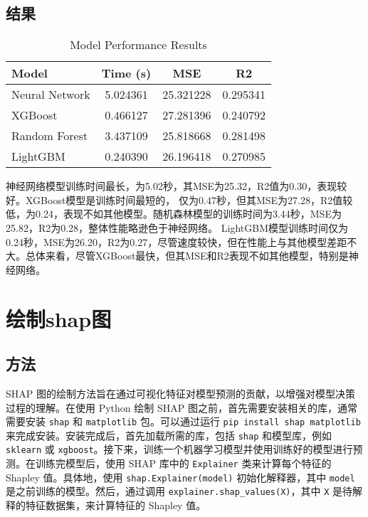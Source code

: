 \documentclass[AutoFakeBold]{LZUThesis-PgD&PhD}
\begin{document}
	\subsection{结果}
		\begin{table}[H]
			\centering
			\begin{tabular}{lccc}
				\toprule
				\textbf{Model} & \textbf{Time (s)} & \textbf{MSE} & \textbf{R2} \\
				\midrule
				Neural Network & 5.024361 & 25.321228 & 0.295341 \\
				XGBoost        & 0.466127 & 27.281396 & 0.240792 \\
				Random Forest  & 3.437109 & 25.818668 & 0.281498 \\
				LightGBM       & 0.240390 & 26.196418 & 0.270985 \\
				\bottomrule
			\end{tabular}
			\caption{Model Performance Results}
			\label{tab:model_performance}
		\end{table}

	
	神经网络模型训练时间最长，为5.02秒，其MSE为25.32，R2值为0.30，表现较好。XGBoost模型是训练时间最短的，
    仅为0.47秒，但其MSE为27.28，R2值较低，为0.24，表现不如其他模型。随机森林模型的训练时间为3.44秒，MSE为25.82，R2为0.28，整体性能略逊色于神经网络。
    LightGBM模型训练时间仅为0.24秒，MSE为26.20，R2为0.27，尽管速度较快，但在性能上与其他模型差距不大。总体来看，尽管XGBoost最快，但其MSE和R2表现不如其他模型，特别是神经网络。

\section{绘制shap图}

\subsection{方法}
SHAP 图的绘制方法旨在通过可视化特征对模型预测的贡献，以增强对模型决策过程的理解。在使用 Python 绘制 SHAP 图之前，首先需要安装相关的库，通常需要安装 \texttt{shap} 和 \texttt{matplotlib} 包。可以通过运行 \texttt{pip install shap matplotlib} 来完成安装。安装完成后，首先加载所需的库，包括 \texttt{shap} 和模型库，例如 \texttt{sklearn} 或 \texttt{xgboost}。接下来，训练一个机器学习模型并使用训练好的模型进行预测。在训练完模型后，使用 SHAP 库中的 \texttt{Explainer} 类来计算每个特征的 Shapley 值。具体地，使用 \texttt{shap.Explainer(model)} 初始化解释器，其中 \texttt{model} 是之前训练的模型。然后，通过调用 \texttt{explainer.shap\_values(X)}，其中 \texttt{X} 是待解释的特征数据集，来计算特征的 Shapley 值。
\end{document}
